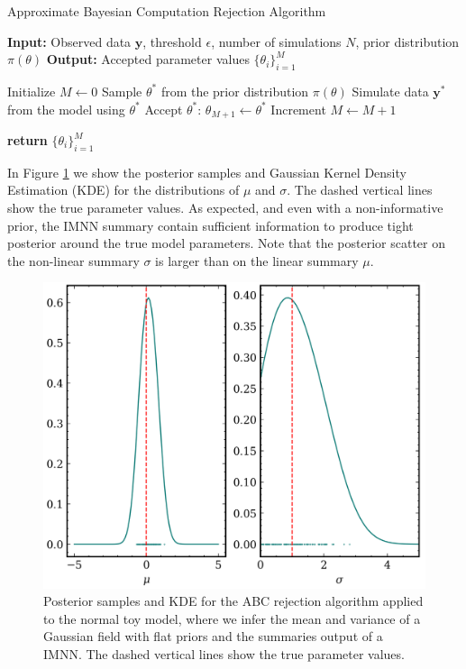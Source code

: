 \begin{algorithm}
    \caption{Approximate Bayesian Computation Rejection Algorithm}\label{alg:ABC}
    \begin{algorithmic}[1]
    \State \textbf{Input:} Observed data $\mathbf{y}$, threshold $\epsilon$, number of simulations $N$, prior distribution $\pi(\theta)$
    \State \textbf{Output:} Accepted parameter values $\{\theta_i\}_{i=1}^M$
    
    \State Initialize $M \gets 0$
        \State Sample $\theta^*$ from the prior distribution $\pi(\theta)$
        \State Simulate data $\mathbf{y}^*$ from the model using $\theta^*$
            \State Accept $\theta^*$: $\theta_{M+1} \gets \theta^*$
            \State Increment $M \gets M + 1$
        \EndIf
    \EndFor
    
    \State \textbf{return} $\{\theta_i\}_{i=1}^M$
    \end{algorithmic}
    \end{algorithm}
In Figure \ref{fig:IMNN normal posterior} we show the posterior samples and Gaussian Kernel Density Estimation (KDE) for the distributions of $\mu$ and $\sigma$. The dashed vertical lines show the true parameter values. As expected, and even with a non-informative prior, the IMNN summary contain sufficient information to produce tight posterior around the true model parameters. Note that the posterior scatter on the non-linear summary $\sigma$ is larger than on the linear summary $\mu$.

\begin{figure}
    \centering
    \includegraphics[width=0.75\linewidth]{img/ML/ABC_posteriors_normal.png}
    \caption{Posterior samples and KDE for the ABC rejection algorithm applied to the normal toy model, where we infer the mean and variance of a Gaussian field with flat priors and the summaries output of a IMNN. The dashed vertical lines show the true parameter values.}
    \label{fig:IMNN normal posterior}
\end{figure}






